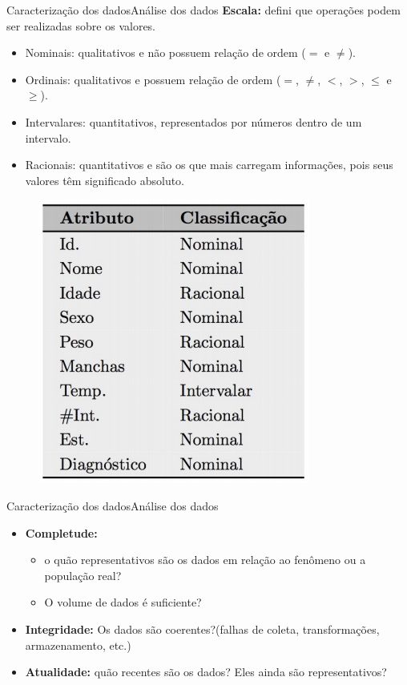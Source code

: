 \documentclass[t]{beamer}
\begin{document}
\begin{ftst}{Caracterização dos dados}{Análise dos dados}
\textbf{Escala:} defini que operações podem ser realizadas sobre os valores.

\begin{itemize}
    \item Nominais: qualitativos e não possuem relação de ordem ($=$ e $\neq$).
    \item Ordinais: qualitativos e possuem relação de ordem ($=$, $\neq$, $<$, $>$, $\leq$ e $\geq$).
    \item Intervalares: quantitativos, representados por números dentro de um intervalo.
    \item Racionais: quantitativos e são os que mais carregam informações, pois seus valores têm significado absoluto.
\end{itemize}

\begin{figure}
    \centering
    \includegraphics[scale=0.4]{Figuras/slide01_03.jpg}
\end{figure}



\end{ftst}


\begin{ftst}{Caracterização dos dados}{Análise dos dados}

\begin{itemize}
    \item \textbf{Completude:} 
    \begin{itemize}
        \item o quão representativos são os dados em relação ao fenômeno ou a população real?
        \item O volume de dados é suficiente?
    \end{itemize}
    \item  \textbf{Integridade:} Os dados são coerentes?(falhas de coleta, transformações, armazenamento, etc.)
    \item  \textbf{Atualidade:} quão recentes são os dados? Eles ainda são representativos?
\end{itemize}
\end{ftst}

\end{document}
